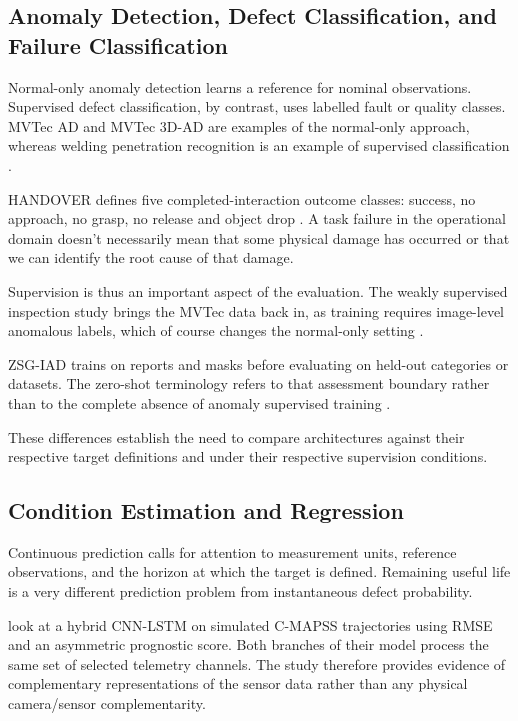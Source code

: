 \subsection{Anomaly Detection, Defect Classification, and Failure Classification}

Normal-only anomaly detection learns a reference for nominal observations. Supervised defect
classification, by contrast, uses labelled fault or quality classes. MVTec AD and MVTec 3D-AD are
examples of the normal-only approach, whereas welding penetration recognition is an example of
supervised classification \parencite{Bergmann2019MVTec,Bergmann2022The,Hua2026Weld}.

HANDOVER defines five completed-interaction outcome classes: success, no approach, no grasp, no
release and object drop \parencite{Thoduka2024Handover}. A task failure in the operational domain
doesn't necessarily mean that some physical damage has occurred or that we can identify the root
cause of that damage.

Supervision is thus an important aspect of the evaluation. The weakly supervised inspection study
brings the MVTec data back in, as training requires image-level anomalous labels, which of course
changes the normal-only setting \parencite[6659]{P035}.

ZSG-IAD trains on reports and masks before evaluating on held-out categories or datasets. The
zero-shot terminology refers to that assessment boundary rather than to the complete absence of
anomaly supervised training \parencite[PDF pp.~6, 8--9]{P025}.

These differences establish the need to compare architectures against their respective target
definitions and under their respective supervision conditions.

\subsection{Condition Estimation and Regression}

Continuous prediction calls for attention to measurement units, reference observations, and the
horizon at which the target is defined. Remaining useful life is a very different prediction problem
from instantaneous defect probability.

\textcite{AlDulaimi2019A} look at a hybrid CNN-LSTM on simulated C-MAPSS trajectories using RMSE and an
asymmetric prognostic score. Both branches of their model process the same
set of selected telemetry channels. The study therefore provides evidence of complementary
representations of the sensor data rather than any physical camera/sensor complementarity.

